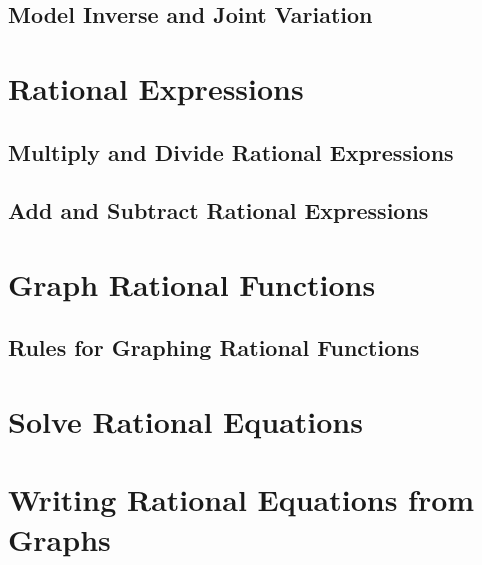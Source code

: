 \documentclass[]{book}
\begin{document}
\hypertarget{model-inverse-and-joint-variation}{%
\subsection{Model Inverse and Joint Variation}\label{model-inverse-and-joint-variation}}

\hypertarget{rational-expressions}{%
\section{Rational Expressions}\label{rational-expressions}}

\hypertarget{multiply-and-divide-rational-expressions}{%
\subsection{Multiply and Divide Rational Expressions}\label{multiply-and-divide-rational-expressions}}

\hypertarget{add-and-subtract-rational-expressions}{%
\subsection{Add and Subtract Rational Expressions}\label{add-and-subtract-rational-expressions}}

\hypertarget{graph-rational-functions}{%
\section{Graph Rational Functions}\label{graph-rational-functions}}

\hypertarget{rules-for-graphing-rational-functions}{%
\subsection{Rules for Graphing Rational Functions}\label{rules-for-graphing-rational-functions}}

\hypertarget{solve-rational-equations}{%
\section{Solve Rational Equations}\label{solve-rational-equations}}

\hypertarget{writing-rational-equations-from-graphs}{%
\section{Writing Rational Equations from Graphs}\label{writing-rational-equations-from-graphs}}
\end{document}
